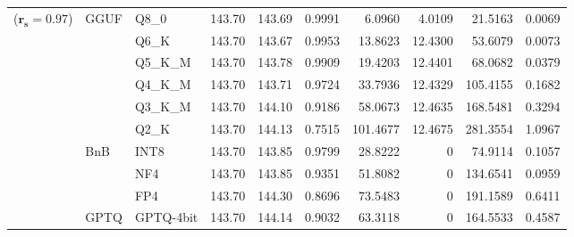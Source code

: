 \begin{table}[t]
{\begin{tabular}{ll l rrrrrrr}
{\small ($\mathbf{r_s{=}0.97}$)} & GGUF & Q8\_0 & 143.70 & 143.69 & 0.9991 & 6.0960 & 4.0109 & 21.5163 & 0.0069 \\
 &  & Q6\_K & 143.70 & 143.67 & 0.9953 & 13.8623 & 12.4300 & 53.6079 & 0.0073 \\
 &  & Q5\_K\_M & 143.70 & 143.78 & 0.9909 & 19.4203 & 12.4401 & 68.0682 & 0.0379 \\
 &  & Q4\_K\_M & 143.70 & 143.71 & 0.9724 & 33.7936 & 12.4329 & 105.4155 & 0.1682 \\
 &  & Q3\_K\_M & 143.70 & 144.10 & \cellcolor{red!18} 0.9186 & \cellcolor{red!18} 58.0673 & 12.4635 & \cellcolor{red!18} 168.5481 & \cellcolor{red!18} 0.3294 \\
 &  & Q2\_K & 143.70 & 144.13 & \cellcolor{red!35} 0.7515 & \cellcolor{red!35} 101.4677 & 12.4675 & \cellcolor{red!35} 281.3554 & \cellcolor{red!35} 1.0967 \\
 & BnB & INT8 & 143.70 & 143.85 & 0.9799 & 28.8222 & \cellcolor{cyan!12} $0$ & 74.9114 & 0.1057 \\
 &  & NF4 & 143.70 & 143.85 & \cellcolor{red!18} 0.9351 & \cellcolor{red!18} 51.8082 & \cellcolor{cyan!12} $0$ & \cellcolor{red!18} 134.6541 & \cellcolor{red!18} 0.0959 \\
 &  & FP4 & 143.70 & 144.30 & \cellcolor{red!18} 0.8696 & \cellcolor{red!18} 73.5483 & \cellcolor{cyan!12} $0$ & \cellcolor{red!18} 191.1589 & \cellcolor{red!18} 0.6411 \\
 & GPTQ & GPTQ-4bit & 143.70 & 144.14 & \cellcolor{red!18} 0.9032 & \cellcolor{red!18} 63.3118 & \cellcolor{cyan!12} $0$ & \cellcolor{red!18} 164.5533 & \cellcolor{red!18} 0.4587 \\
\bottomrule
\end{tabular}}
\end{table}